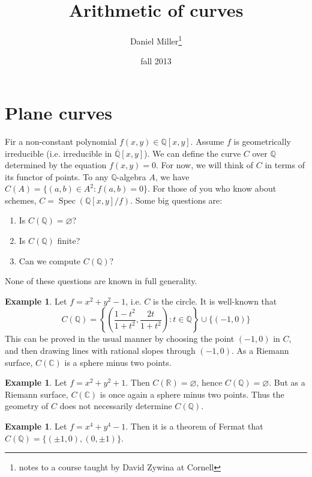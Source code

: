 \documentclass{article}
\title{Arithmetic of curves}
\author{Daniel Miller\thanks{notes to a course taught by David Zywina at Cornell}}
\date{fall 2013}
\DeclareMathOperator{\spec}{Spec}
\theoremstyle{definition}
\newtheorem{example}[subsection]{Example}
\begin{document}
\maketitle











\section{Plane curves}

Fir a non-constant polynomial $f(x,y)\in\mathbb{Q}[x,y]$. Assume $f$ is 
geometrically irreducible (i.e. irreducible in $\overline{\mathbb{Q}}[x,y]$). 
We can define the curve $C$ over $\mathbb{Q}$ determined by the equation 
$f(x,y)=0$. For now, we will think of $C$ in terms of its functor of points. 
To any $\mathbb{Q}$-algebra $A$, we have $C(A)=\{(a,b)\in A^2:f(a,b)=0\}$. 
For those of you who know about schemes, 
$C=\spec\left(\mathbb{Q}[x,y]/f\right)$. Some big questions are:
\begin{enumerate}
  \item Is $C(\mathbb{Q})=\varnothing$?
  \item Is $C(\mathbb{Q})$ finite?
  \item Can we compute $C(\mathbb{Q})$?
\end{enumerate}
None of these questions are known in full generality. 

\begin{example}
Let $f=x^2+y^2-1$, i.e. $C$ is the circle. It is well-known that 
\[
  C(\mathbb{Q})=\left\{\left(\frac{1-t^2}{1+t^2},\frac{2t}{1+t^2}\right):t\in\mathbb{Q}\right\}\cup \{(-1,0)\}
\]
This can be proved in the usual manner by choosing the point 
$(-1,0)$ in $C$, and then drawing lines with rational slopes through 
$(-1,0)$. As a Riemann surface, $C(\mathbb{C})$ is a sphere minus 
two points. 
\end{example}

\begin{example}
Let $f=x^2+y^2+1$. Then $C(\mathbb{R})=\varnothing$, hence 
$C(\mathbb{Q})=\varnothing$. But as a Riemann surface, $C(\mathbb{C})$ is 
once again a sphere minus two points. Thus the geometry of $C$ does not 
necessarily determine $C(\mathbb{Q})$. 
\end{example}

\begin{example}
Let $f=x^4+y^4-1$. Then it is a theorem of Fermat that 
$C(\mathbb{Q})=\{(\pm 1,0),(0,\pm 1)\}$.
\end{example}
\end{document}
